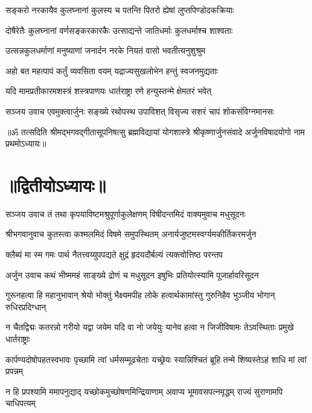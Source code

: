 \twolineshloka
{सङ्करो नरकायैव कुलघ्नानां कुलस्य च}
{पतन्ति पितरो ह्येषां लुप्तपिण्डोदकक्रियाः}%

\twolineshloka
{दोषैरेतैः कुलघ्नानां वर्णसङ्करकारकैः}
{उत्साद्यन्ते जातिधर्माः कुलधर्माश्च शाश्वताः}%

\twolineshloka
{उत्सन्नकुलधर्माणां मनुष्याणां जनार्दन}
{नरके नियतं वासो भवतीत्यनुशुश्रुम}%

\twolineshloka
{अहो बत महत्पापं कर्तुं व्यवसिता वयम्}
{यद्राज्यसुखलोभेन हन्तुं स्वजनमुद्यताः}%

\twolineshloka
{यदि मामप्रतीकारमशस्त्रं शस्त्रपाणयः}
{धार्तराष्ट्रा रणे हन्युस्तन्मे क्षेमतरं भवेत्}%

{सञ्जय उवाच}
\twolineshloka
{एवमुक्त्वार्जुनः सङ्ख्ये रथोपस्थ उपाविशत्}
{विसृज्य सशरं चापं शोकसंविग्नमानसः}%

{॥ॐ तत्सदिति श्रीमद्भगवद्गीतासूपनिषत्सु ब्रह्मविद्यायां योगशास्त्रे श्रीकृष्णार्जुनसंवादे अर्जुनविषादयोगो नाम प्रथमोऽध्यायः॥}

\section{॥द्वितीयोऽध्यायः॥}

{सञ्जय उवाच}
\twolineshloka
{तं तथा कृपयाविष्टमश्रुपूर्णाकुलेक्षणम्}
{विषीदन्तमिदं वाक्यमुवाच मधुसूदनः}%

{श्रीभगवानुवाच}
\twolineshloka
{कुतस्त्वा कश्मलमिदं विषमे समुपस्थितम्}
{अनार्यजुष्टमस्वर्ग्यमकीर्तिकरमर्जुन}%

\twolineshloka
{क्लैब्यं मा स्म गमः पार्थ नैतत्त्वय्युपपद्यते}
{क्षुद्रं हृदयदौर्बल्यं त्यक्त्वोत्तिष्ठ परन्तप}%

{अर्जुन उवाच}
\twolineshloka
{कथं भीष्ममहं साङ्ख्ये द्रोणं च मधुसूदन}
{इषुभिः प्रतियोत्स्यामि पूजार्हावरिसूदन}%

\fourlineindentedshloka
{गुरूनहत्वा हि महानुभावान्}
{श्रेयो भोक्तुं भैक्ष्यमपीह लोके}
{हत्वार्थकामांस्तु गुरुनिहैव}
{भुञ्जीय भोगान् रुधिरप्रदिग्धान्}%

\fourlineindentedshloka
{न चैतद्विद्मः कतरन्नो गरीयो}
{यद्वा जयेम यदि वा नो जयेयुः}
{यानेव हत्वा न जिजीविषामः}
{तेऽवस्थिताः प्रमुखे धार्तराष्ट्राः}%

\fourlineindentedshloka
{कार्पण्यदोषोपहतस्वभावः}
{पृच्छामि त्वां धर्मसम्मूढचेताः}
{यच्छ्रेयः स्यान्निश्चितं ब्रूहि तन्मे}
{शिष्यस्तेऽहं शाधि मां त्वां प्रपन्नम्}%

\fourlineindentedshloka
{न हि प्रपश्यामि ममापनुद्याद्}
{यच्छोकमुच्छोषणमिन्द्रियाणाम्}
{अवाप्य भूमावसपत्नमृद्धम्}
{राज्यं सुराणामपि चाधिपत्यम्}%

